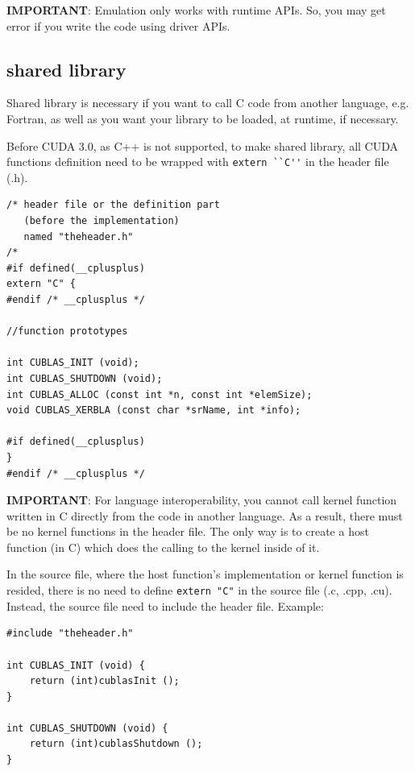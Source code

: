 \begin{framed}
  {\bf IMPORTANT}: Emulation only works with runtime APIs. So, you may
get error if you write the code using driver APIs.
\end{framed}

\subsection{shared library}
\label{sec:shared-library-1}

Shared library is necessary if you want to call C code from another
language, e.g. Fortran, as well as you want your library to be loaded,
at runtime, if necessary.

Before CUDA 3.0, as C++ is not supported, to make shared library, all CUDA
functions definition need to be wrapped with \verb!extern ``C''! in the header
file (.h).
\begin{lstlisting}
/* header file or the definition part 
   (before the implementation)
   named "theheader.h"
/*
#if defined(__cplusplus)
extern "C" {
#endif /* __cplusplus */                                                

//function prototypes
                                          
int CUBLAS_INIT (void);
int CUBLAS_SHUTDOWN (void);
int CUBLAS_ALLOC (const int *n, const int *elemSize);
void CUBLAS_XERBLA (const char *srName, int *info);

#if defined(__cplusplus)
}
#endif /* __cplusplus */
\end{lstlisting}

\begin{framed}
  {\bf IMPORTANT}: For language interoperability, you cannot call
  kernel function written in C directly from the code in another
  language. As a result, there must be no kernel functions in the
  header file. The only way is to create a host function (in C) which
  does the calling to the kernel inside of it.
\end{framed}

In the source file, where the host function's implementation or kernel
function is resided, there is no need to define \verb!extern "C"! in
the source file (.c, .cpp, .cu). Instead, the source file need to
include the header file. Example:
\begin{lstlisting}
#include "theheader.h"

int CUBLAS_INIT (void) {
    return (int)cublasInit ();
}

int CUBLAS_SHUTDOWN (void) {
    return (int)cublasShutdown ();
}
\end{lstlisting}

